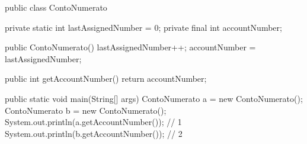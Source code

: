 \begin{unipdcode}[language=Java]
public class ContoNumerato {
    private static int lastAssignedNumber = 0;
    private final int accountNumber;

    public ContoNumerato() {
        lastAssignedNumber++;
        accountNumber = lastAssignedNumber;
    }

    public int getAccountNumber() {
        return accountNumber;
    }

    public static void main(String[] args) {
        ContoNumerato a = new ContoNumerato();
        ContoNumerato b = new ContoNumerato();
        System.out.println(a.getAccountNumber()); // 1
        System.out.println(b.getAccountNumber()); // 2
    }
}
\end{unipdcode}
